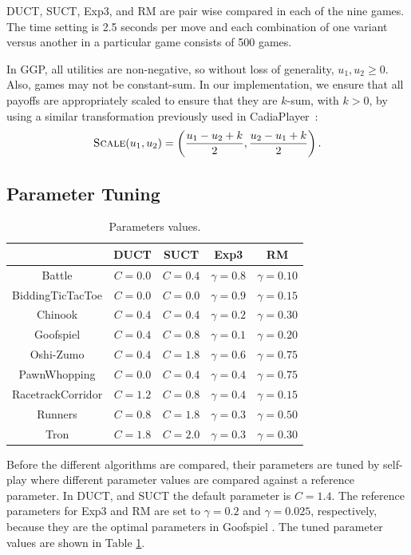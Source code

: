 \documentclass[conference]{IEEEtran}
\newcommand{\Cadiaplayer}{{\sc CadiaPlayer}\xspace}
\begin{document}
DUCT, SUCT, Exp3, and RM are pair wise compared in each of the nine games. The time setting is 2.5 seconds per move and 
each combination of one variant versus another in a particular game consists of 500 games.  

In GGP, all utilities are non-negative, so without loss of generality, $u_1, u_2 \ge 0$.  
Also, games may not be constant-sum. In our implementation, we ensure that all payoffs 
are appropriately scaled to ensure that they are $k$-sum, with $k > 0$, by using 
a similar transformation previously used in \Cadiaplayer~\cite{Finnsson12}:
\[ \text{\sc Scale}(u_1, u_2) = \left( \frac{u_1 - u_2 + k}{2}, \frac{u_2 - u_1 + k}{2} \right). \]

\subsection{Parameter Tuning}

\begin{table}[t!]
\centering
\begin{tabular}{|c|c|c|c|c|}
\hline
                  & DUCT    & SUCT    & Exp3           & RM  \\
\hline
Battle            & $C=0.0$ & $C=0.4$ & $\gamma = 0.8$ & $\gamma = 0.10$  \\ 
BiddingTicTacToe  & $C=0.0$ & $C=0.0$ & $\gamma = 0.9$ & $\gamma = 0.15$   \\ 
Chinook           & $C=0.4$ & $C=0.4$ & $\gamma = 0.2$ & $\gamma = 0.30$ \\ 
Goofspiel         & $C=0.4$ & $C=0.8$ & $\gamma = 0.1$ & $\gamma = 0.20$ \\ 
Oshi-Zumo         & $C=0.4$ & $C=1.8$ & $\gamma = 0.6$ & $\gamma = 0.75$ \\ 
PawnWhopping      & $C=0.0$ & $C=0.4$ & $\gamma = 0.4$ & $\gamma = 0.75$  \\ 
RacetrackCorridor & $C=1.2$ & $C=0.8$ & $\gamma = 0.4$ & $\gamma = 0.15$\\ 
Runners           & $C=0.8$ & $C=1.8$ & $\gamma = 0.3$ & $\gamma = 0.50$ \\
Tron              & $C=1.8$ & $C=2.0$ & $\gamma = 0.3$ & $\gamma = 0.30$ \\
 \hline
\end{tabular}
\caption{Parameters values. \label{tbl:parameters}}
\end{table}


Before the different algorithms are compared, their parameters are tuned by self-play where different parameter 
values are compared against a reference parameter. In DUCT, and SUCT the default parameter is $C=1.4$. The reference
parameters for Exp3 and RM are set to $\gamma = 0.2$ and $\gamma = 0.025$, respectively, because they are the optimal 
parameters in Goofspiel \cite{Lanctot13Goofspiel}. The tuned parameter values are shown in Table \ref{tbl:parameters}. 
\end{document}
